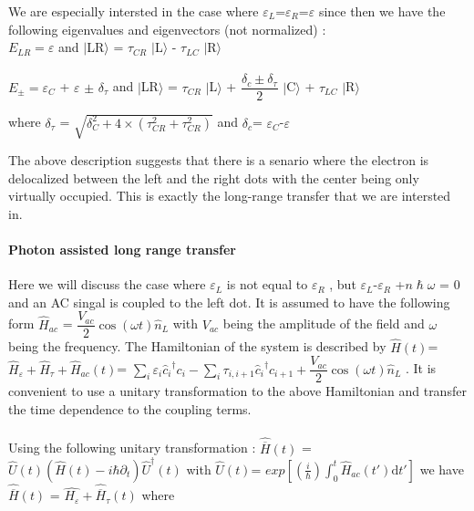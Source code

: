 We are especially intersted in the case where $\varepsilon_{L}$=$\varepsilon_{R}$=$\varepsilon$ since then we have the following eigenvalues and eigenvectors (not normalized) : \\
 $E_{LR}=\varepsilon$ and $\vert$LR$\rangle$ = $\tau_{CR}$  $\vert$L$\rangle$ - $\tau_{LC}$ $\vert$R$\rangle$ 
 \\
 \\
 $E_{\pm}= \varepsilon_{C}$ + $ \varepsilon $ $\pm$ $\delta_{\tau}$ and $\vert$LR$\rangle$ = $\tau_{CR}$  $\vert$L$\rangle$ + $\dfrac{\delta_{c}\pm\delta_{\tau}}{2}$ $\vert$C$\rangle$ + $\tau_{LC}$ $\vert$R$\rangle$ 
 \\
  \begin{small}
 where 
 $\delta_{\tau}$ = $\sqrt{\delta_{C}^{2}+4\times\left( \tau_{CR}^{2} + \tau_{CR}^{2}\right) }$
 and  $\delta_{c}$= $\varepsilon_{C}$-$\varepsilon$  
 \end{small}
 
The above description suggests that there is a senario where the electron is delocalized between the left and the right dots with the center being only virtually occupied. This is exactly the long-range transfer that we are intersted in.
 

\paragraph{Photon assisted long range transfer}


Here we will discuss the case where $\varepsilon_{L}$ is not equal to $\varepsilon_{R}$ , but $\varepsilon_{L}$-$\varepsilon_{R}$ +$n\hslash\omega$ = 0 and an AC singal is coupled to the left dot. It is assumed to have the following form $\widehat{H}_{ac}$ = $\dfrac{V_{ac}}{2}\cos(\omega t)\widehat{n}_L$ with $V_{ac}$ being the amplitude of the field and $\omega$ being the frequency. The Hamiltonian of the system is described by  $\widehat{H}(t)$= $\widehat{H}_{\varepsilon} +\widehat{H}_{\tau}+\widehat{H}_{ac}(t)$= $\sum_{i} \varepsilon_{i}{\widehat{c}_{i}}^{\dagger} c_{i} - \sum_{i} \tau_{i,i+1}{\widehat{c}_{i}}^{\dagger} c_{i+1} + \dfrac{V_{ac}}{2}\cos(\omega t)\widehat{n}_L$ . It is convenient to use a unitary transformation to the above Hamiltonian and transfer the time dependence to the coupling terms.  
\\
   \\
   Using the following unitary transformation : $\widehat{\overline{H}}(t)$  = $\widehat{U}(t)(\widehat{H}(t)-i\hbar\partial_t){\widehat{U}}^{\dagger}(t)$ with $\widehat{U}(t)$= $ exp[ (\frac{i}{\hbar})\int_0^{t} \widehat{H}_{ac} (t') \mathrm{d}t']$ we have $\widehat{\overline{H}}(t)$ = $\widehat{H_{\varepsilon}} +\widehat{\overline{H}}_{\tau}(t)$ where 
 

